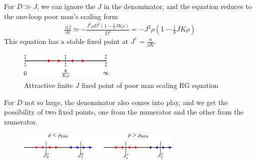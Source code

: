 \documentclass{revtex4-2}
\numberwithin{equation}{section}
\begin{document}
For \(D \gg J\), we can ignore the \(J\) in the denominator, and the equation reduces to the one-loop poor man's scaling form
\begin{equation}\begin{aligned}
	\label{pms_mchannel}
	\frac{\:\mathrm{d}J}{\:\mathrm{d}t} \simeq -\frac{J^2 \rho D^2 \left(1 - \frac{1}{8}JK\rho\right)}{D^2} = -J^2 \rho \left(1 - \frac{1}{8}JK\rho\right)
\end{aligned}\end{equation}
This equation has a stable fixed point at \(J^* = \frac{8}{\rho K}\).

\begin{figure}[htpb]
	\centering
	\includegraphics[width=0.4\textwidth]{rg_flow_pms.pdf}
	\caption{Attractive finite \(J\) fixed point of poor man scaling RG equation}
\end{figure}
For \(D\) not so large, the denominator also comes into play, and we get the possibility of two fixed points, one from the numerator and the other from the numerator.
\begin{figure}[htpb]
	\centering
	\includegraphics[width=0.7\textwidth]{./rg_flow.pdf}
	\caption{}
	\label{rg_flow_general}
\end{figure}
\end{document}
